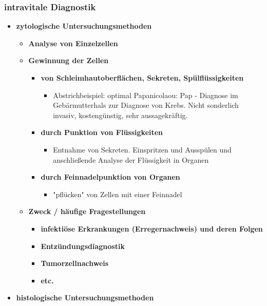 \subsubsection{intravitale Diagnostik}
	\begin{itemize}
		\item \textbf{zytologische Untersuchungsmethoden}
			\begin{itemize}
				\item \textbf{Analyse von Einzelzellen}
				\item \textbf{Gewinnung der Zellen}
					\begin{itemize}
						\item \textbf{von Schleimhautoberflächen, Sekreten, Spülflüssigkeiten}
							\begin{itemize}
								\item Abstrichbeispiel: optimal Papanicolaou: Pap - Diagnose im Gebärmutterhals zur Diagnose von Krebs. Nicht sonderlich invasiv, kostengünstig, sehr aussagekräftig.
							\end{itemize}
						\item \textbf{durch Punktion von Flüssigkeiten}
							\begin{itemize}
								\item Entnahme von Sekreten. Einspritzen und Ausspülen und anschließende Analyse der Flüssigkeit in Organen
							\end{itemize}
						\item \textbf{durch Feinnadelpunktion von Organen}
							\begin{itemize}
								\item "pflücken" von Zellen mit einer Feinnadel
							\end{itemize}
					\end{itemize}
				\item \textbf{Zweck / häufige Fragestellungen}
					\begin{itemize}
						\item \textbf{infektiöse Erkrankungen (Erregernachweis) und deren Folgen}
						\item \textbf{Entzündungsdiagnostik}
						\item \textbf{Tumorzellnachweis}
						\item \textbf{etc.}
					\end{itemize}
			\end{itemize}
		\item \textbf{histologische Untersuchungsmethoden}
			\begin{itemize}

\end{itemize}
\end{itemize}
